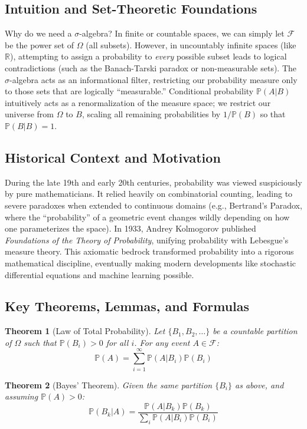 \documentclass[11pt]{article}
\newtheorem{theorem}{Theorem}[section]
\theoremstyle{definition}
\theoremstyle{remark}
\newcommand{\R}{\mathbb{R}}
\newcommand{\F}{\mathcal{F}}
\newcommand{\Prob}{\mathbb{P}}
\begin{document}
\subsection{Intuition and Set-Theoretic Foundations}
Why do we need a $\sigma$-algebra? In finite or countable spaces, we can simply let $\F$ be the power set of $\Omega$ (all subsets). However, in uncountably infinite spaces (like $\R$), attempting to assign a probability to \textit{every} possible subset leads to logical contradictions (such as the Banach-Tarski paradox or non-measurable sets). The $\sigma$-algebra acts as an informational filter, restricting our probability measure only to those sets that are logically ``measurable.'' Conditional probability $\Prob(A|B)$ intuitively acts as a renormalization of the measure space; we restrict our universe from $\Omega$ to $B$, scaling all remaining probabilities by $1/\Prob(B)$ so that $\Prob(B|B) = 1$.

\subsection{Historical Context and Motivation}
During the late 19th and early 20th centuries, probability was viewed suspiciously by pure mathematicians. It relied heavily on combinatorial counting, leading to severe paradoxes when extended to continuous domains (e.g., Bertrand's Paradox, where the ``probability'' of a geometric event changes wildly depending on how one parameterizes the space). In 1933, Andrey Kolmogorov published \textit{Foundations of the Theory of Probability}, unifying probability with Lebesgue's measure theory. This axiomatic bedrock transformed probability into a rigorous mathematical discipline, eventually making modern developments like stochastic differential equations and machine learning possible.

\subsection{Key Theorems, Lemmas, and Formulas}
\begin{theorem}[Law of Total Probability]
Let $\{B_1, B_2, \dots\}$ be a countable partition of $\Omega$ such that $\Prob(B_i) > 0$ for all $i$. For any event $A \in \F$:
\[ \Prob(A) = \sum_{i=1}^{\infty} \Prob(A | B_i) \Prob(B_i) \]
\end{theorem}

\begin{theorem}[Bayes' Theorem]
Given the same partition $\{B_i\}$ as above, and assuming $\Prob(A) > 0$:
\[ \Prob(B_k | A) = \frac{\Prob(A | B_k) \Prob(B_k)}{\sum_{i} \Prob(A | B_i) \Prob(B_i)} \]
\end{theorem}
\end{document}

